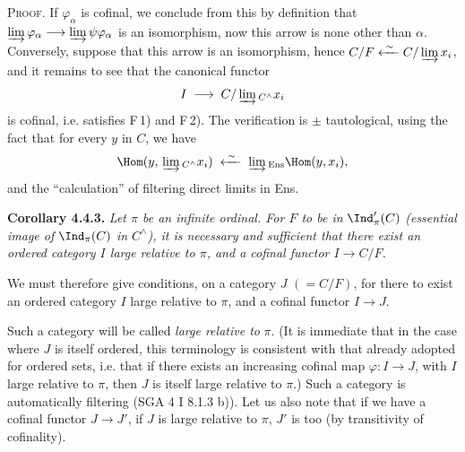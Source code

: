 \textsc{Proof}. If $\varphi_\alpha$ is cofinal, we conclude from this by definition that $\varinjlim \varphi_\alpha \longrightarrow \varinjlim \psi\varphi_\alpha$ is an isomorphism, now this arrow is none other than $\alpha$. Conversely, suppose that this arrow is an isomorphism, hence $C/F \xleftarrow{\;\sim\;} C/\varinjlim x_i$, and it remains to see that the canonical functor
\[
I \;\longrightarrow\; C/\varinjlim{}_{C^{\wedge}} x_i
\]
is cofinal, i.e. satisfies F\,1) and F\,2). The verification is $\pm$ tautological, using the fact that for every $y$ in $C$, we have
\[
\Hom(y,\, \varinjlim{}_{C^{\wedge}} x_i) \;\xleftarrow{\;\sim\;}\; \varinjlim{}_{\mathrm{Ens}}\Hom(y,x_i),
\]
and the ``calculation'' of filtering direct limits in Ens.

\textbf{Corollary 4.4.3.} \textit{Let $\pi$ be an infinite ordinal. For $F$ to be in} $\Ind'_\pi(C)$ \textit{(essential image of} $\Ind_\pi(C)$ \textit{in $C^{\wedge}$), it is necessary and sufficient that there exist an ordered category $I$ large relative to $\pi$, and a cofinal functor $I \longrightarrow C/F$.}

We must therefore give conditions, on a category $J$ $(= C/F)$, for there to exist an ordered category $I$ large relative to $\pi$, and a cofinal functor $I \longrightarrow J$.

Such a category will be called \textit{large relative to} $\pi$. (It is immediate that in the case where $J$ is itself ordered, this terminology is consistent with that already adopted for ordered sets, i.e. that if there exists an increasing cofinal map $\varphi : I \longrightarrow J$, with $I$ large relative to $\pi$, then $J$ is itself large relative to $\pi$.) Such a category is
automatically filtering (SGA 4 I 8.1.3 b)). Let us also note that if we have a cofinal functor $J \longrightarrow J'$, if $J$ is large relative to $\pi$, $J'$ is too (by transitivity of cofinality).

